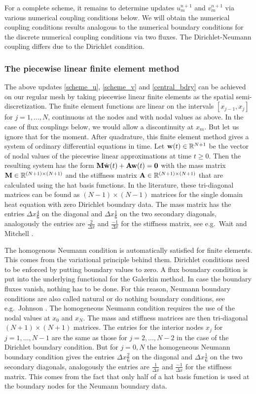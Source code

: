 For a complete scheme, it remains to determine updates $u_{m}^{n+1}$ and $v_m^{n+1}$ 
via various numerical coupling conditions below.
We will obtain the numerical coupling conditions results analogous to the numerical boundary conditions for the 
discrete numerical coupling conditions via two fluxes.
The Dirichlet-Neumann coupling differs due to the Dirichlet condition. 

%
%
\subsubsection*{The piecewise linear finite element method}
%
%

The above updates \eqref{scheme_u}, \eqref{scheme_v} and \eqref{central_bdry} can be achieved on our regular mesh by 
taking piecewise linear finite elements as the spatial semi-discretization. The finite element functions are
linear on the intervals $[x_{j-1},x_j]$ for $j=1,\ldots ,N$, continuous at the nodes and with nodal values as above.
In the case of flux couplings below, we would allow a discontinuity at $x_m$. But let us ignore that for the moment.
After quadrature, this finite element method gives a system of ordinary
differential equations in time. Let ${\mathbf w}(t)\in\mathbb{R}^{N+1}$ be the vector of nodal values of the piecewise linear
approximations at time $t\ge 0$. Then the resulting system has the form ${\mathbf M}\dot{{\mathbf w}}(t) +{\mathbf A}{\mathbf w}(t)={\mathbf 0}$ with
the mass matrix ${\mathbf M}\in\mathbb{R}^{(N+1)\times (N+1)}$ and the stiffness matrix ${\mathbf A}\in\mathbb{R}^{(N+1)\times (N+1)}$ 
that are calculated using the hat basis functions.
In the literature, these tri-diagonal matrices can be found as $(N-1)\times(N-1)$ matrices 
for the single domain heat equation 
with zero Dirichlet boundary data. The mass matrix has the entries $\Delta x\frac 46$ on the diagonal and
$\Delta x\frac 16$ on the two secondary diagonals, analogously the entries are $\frac 2{\Delta x}$ 
and $\frac {-1}{\Delta x}$ for the stiffness matrix, see e.g.\ Wait and Mitchell \cite[Section 5.2]{bWAMI}.

The homogenous Neumann condition is automatically satisfied for finite elements. 
This comes from the variational principle behind them.
Dirichlet conditions need to be enforced by putting boundary values to zero. A flux boundary condition is
put into the underlying functional for the Galerkin method. In case the boundary fluxes vanish, nothing has to be done. 
For this reason, Neumann boundary conditions
are also called natural or do nothing boundary conditions, see e.g.\ Johnson \cite[Section 1.7]{bJOHN}.
The homogeneous Neumann condition requires the use of the nodal values at $x_0$ and $x_N$. The mass and stiffness matrices
are then tri-diagonal $(N+1)\times (N+1)$ matrices. The entries for the interior nodes $x_j$ for $j=1,\ldots, N-1$ are the same
as those for $j=2,\ldots ,N-2$ in the case of the Dirichlet boundary condition. But for $j=0,N$ the homogeneous Neumann boundary
condition gives the entries $\Delta x\frac 26$ on the diagonal and
$\Delta x\frac 16$ on the two secondary diagonals, analogously the entries are $\frac 1{\Delta x}$ 
and $\frac {-1}{\Delta x}$ for the stiffness matrix. This comes from the fact that only half of a hat basis function is
used at the boundary nodes for the Neumann boundary data.


